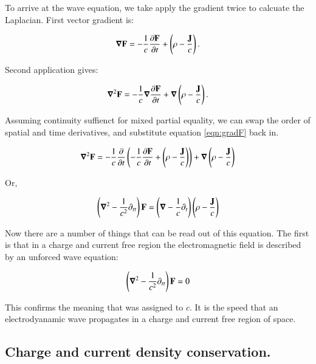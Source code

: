 \documentclass{article}      %
\newcommand{\spacegrad}[0]{\boldsymbol{\nabla}}
\begin{document}
To arrive at the wave equation, we take apply the gradient twice to calcuate the Laplacian.  First vector gradient is:

\begin{equation}\label{eqn:gradF}
\spacegrad \BF = -\inv{c}\frac{\partial \BF}{\partial t} + \left(\rho - \frac{\BJ}{c}\right).
\end{equation}

Second application gives:

\begin{equation*}
\spacegrad^2 \BF = -\inv{c}\spacegrad\frac{\partial \BF}{\partial t} + \spacegrad \left(\rho - \frac{\BJ}{c}\right).
\end{equation*}

Assuming continuity suffienct for mixed partial equality, we can swap the order of spatial and time derivatives, and
substitute equation \ref{eqn:gradF} back in.

\begin{align*}
\spacegrad^2 \BF 
&= -\inv{c}\frac{\partial}{\partial t}\left( -\inv{c}\frac{\partial \BF}{\partial t} + \left(\rho - \frac{\BJ}{c}\right) \right) + \spacegrad \left(\rho - \frac{\BJ}{c}\right) \\
\end{align*}

Or,

\begin{equation} \label{eqn:wave}
\left(\spacegrad^2 - \inv{c^2}\partial_{tt} \right)\BF = \left(\spacegrad - \inv{c}\partial_{t} \right) \left(\rho - \frac{\BJ}{c}\right) 
\end{equation}

Now there are a number of things that can be read out of this equation.  The first is that in a charge and current free region the electromagnetic field is described by an unforced wave equation:

\begin{equation}
\left(\spacegrad^2 - \inv{c^2}\partial_{tt} \right)\BF = 0
\end{equation}

This confirms the meaning that was assigned to $c$.
It is the speed that an electrodyanamic wave propagates in a charge and current free region of space.

\subsection{ Charge and current density conservation. }
\end{document}
